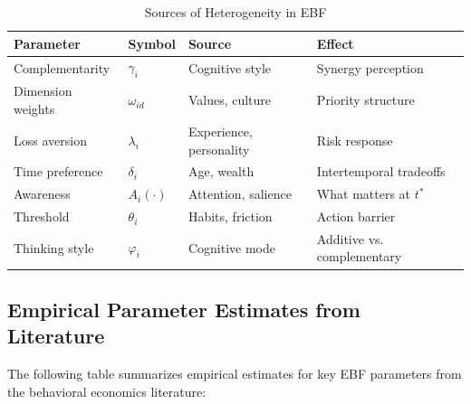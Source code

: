 \begin{table}[htbp]
\centering
\caption{Sources of Heterogeneity in EBF}
\label{tab:az-heterogeneity}
\renewcommand{\arraystretch}{1.3}
\begin{tabular}{@{}llll@{}}
\toprule
\textbf{Parameter} & \textbf{Symbol} & \textbf{Source} & \textbf{Effect} \\
\midrule
Complementarity & $\gamma_i$ & Cognitive style & Synergy perception \\
Dimension weights & $\omega_{id}$ & Values, culture & Priority structure \\
Loss aversion & $\lambda_i$ & Experience, personality & Risk response \\
Time preference & $\delta_i$ & Age, wealth & Intertemporal tradeoffs \\
Awareness & $A_i(\cdot)$ & Attention, salience & What matters at $t^*$ \\
Threshold & $\theta_i$ & Habits, friction & Action barrier \\
Thinking style & $\varphi_i$ & Cognitive mode & Additive vs. complementary \\
\bottomrule
\end{tabular}
\end{table}

\subsection{Empirical Parameter Estimates from Literature}

The following table summarizes empirical estimates for key EBF parameters
from the behavioral economics literature:


